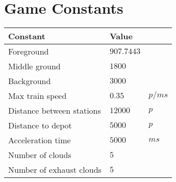 \chapter{Game Constants}

\begin{table}[H]
\centering
\begin{tabular}{| l | l l |}
\hline
\textbf{Constant} & \textbf{Value} & \\
\hline
Foreground & $907.7443$ &\\
Middle ground & $1800$ &\\
Background & $3000$ &\\
Max train speed & $0.35$ & $p/ms$\\
Distance between stations & $12000$ & $p$\\
Distance to depot & $5000$ & $p$\\
Acceleration time & $5000$ & $ms$\\
Number of clouds & $5$ &\\
Number of exhaust clouds & $5$ &\\
\hline
\end{tabular}
\end{table}
